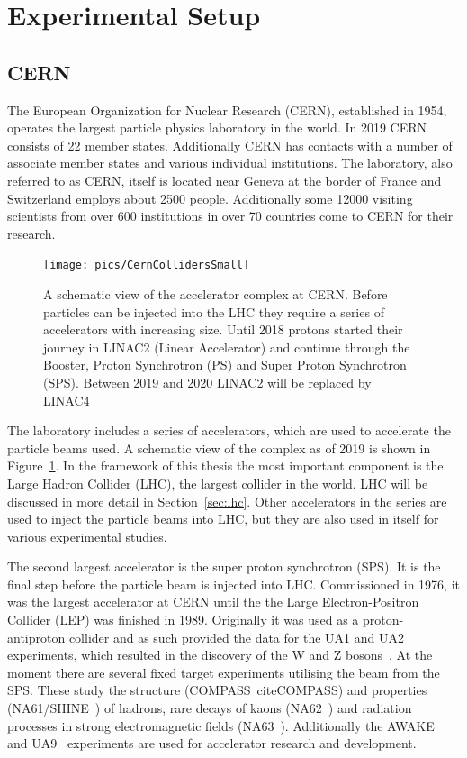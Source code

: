 
\section{Experimental Setup}
\label{sec:exp}
\subsection{CERN}
The European Organization for Nuclear Research (CERN), established in 1954, operates the largest particle physics laboratory in the world. In 2019 CERN consists of 22 member states. Additionally CERN has contacts with a number of associate member states and various individual institutions. The laboratory, also referred to as CERN, itself is located near Geneva at the border of France and Switzerland employs about 2500 people. Additionally some 12000 visiting scientists from over 600 institutions in over 70 countries come to CERN for their research.~\cite{CERN}

\begin{figure}[tb]
\centering
\texttt{[image: pics/CernCollidersSmall]}
\caption[CERN collider complex]{ A schematic view of the accelerator complex at CERN. Before particles can be injected into the LHC they require a series of accelerators with increasing size. Until 2018 protons started their journey in LINAC2 (Linear Accelerator) and continue through the Booster, Proton Synchrotron (PS) and Super Proton Synchrotron (SPS). Between 2019 and 2020 LINAC2 will be replaced by LINAC4~\cite{CernComplex}}
\label{fig:CernComplex}
\end{figure}

The laboratory includes a series of accelerators, which are used to accelerate the particle beams used. A schematic view of the complex as of 2019 is shown in Figure~\ref{fig:CernComplex}. In the framework of this thesis the most important component is the Large Hadron Collider (LHC), the largest collider in the world. LHC will be discussed in more detail in Section~\ref{sec:lhc}. Other accelerators in the series are used to inject the particle beams into LHC, but they are also used in itself for various experimental studies. 

The second largest accelerator is the super proton synchrotron (SPS). It is the final step before the particle beam is injected into LHC. Commissioned in 1976, it was the largest accelerator at CERN until the the Large Electron-Positron Collider (LEP) was finished in 1989. Originally it was used as a proton-antiproton collider and as such provided the data for the UA1 and UA2 experiments, which resulted in the discovery of the W and Z bosons~\cite{Watkins:1986va}. At the moment there are several fixed target experiments utilising the beam from the SPS. These study the structure (COMPASS~cite{COMPASS}) and properties (NA61/SHINE~\cite{Laszlo:2009vg}) of hadrons, rare decays of kaons (NA62~\cite{Hahn:1404985}) and radiation processes in strong electromagnetic fields (NA63~\cite{Mikkelsen:1955391}). Additionally the AWAKE~\cite{Dobert:2669231} and UA9~\cite{Losito:1223625} experiments are used for accelerator research and development. 

